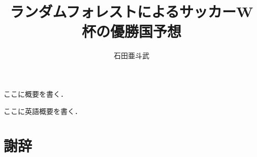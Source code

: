 \documentclass[platex]{suribt}
\title{ランダムフォレストによるサッカーW杯の優勝国予想}
\author{石田亜斗武}
\begin{document}
\maketitle%


\frontmatter%
\begin{jabstract}%
 ここに概要を書く．
\end{jabstract}

\newpage

\begin{eabstract}%
 ここに英語概要を書く．
\end{eabstract}


\tableofcontents%

\mainmatter%
\chapter{}

\backmatter%
\chapter{謝辞}%

\begin{thebibliography}{}%
 \bibitem{}
\end{thebibliography}

\appendix%
\chapter{}
\end{document}
